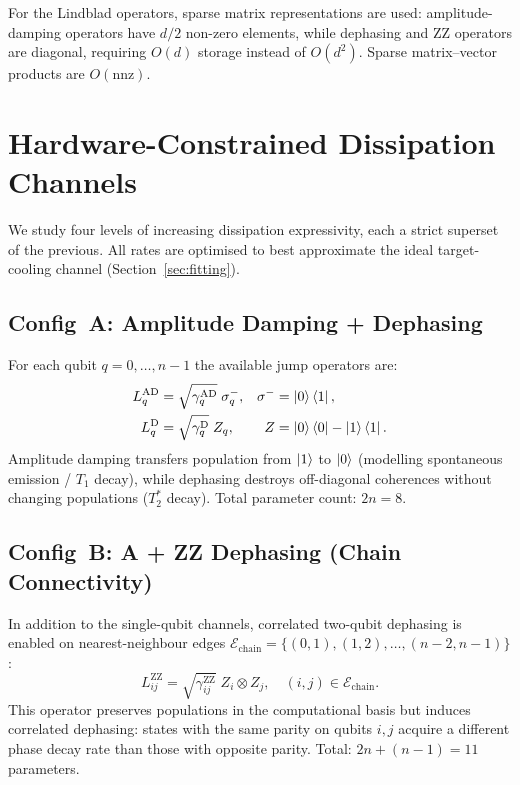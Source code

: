 \documentclass[11pt,a4paper]{article}
\begin{document}
For the Lindblad operators, sparse matrix representations are used:
amplitude-damping operators have $d/2$ non-zero elements, while
dephasing and ZZ operators are diagonal, requiring $O(d)$ storage
instead of $O(d^2)$.  Sparse matrix--vector products are $O(\text{nnz})$.


\section{Hardware-Constrained Dissipation Channels}
\label{sec:channels}

We study four levels of increasing dissipation expressivity, each a
strict superset of the previous.  All rates are optimised to best
approximate the ideal target-cooling channel (Section~\ref{sec:fitting}).

\subsection{Config~A: Amplitude Damping + Dephasing}

For each qubit $q = 0, \ldots, n-1$ the available jump operators are:
\begin{align}
L_q^\text{AD} &= \sqrt{\gamma_q^\text{AD}}\;\sigma_q^- ,
& \sigma^- &= \ket{0}\bra{1}, \label{eq:amp_damp} \\
L_q^\text{D}  &= \sqrt{\gamma_q^\text{D}}\;Z_q ,
& Z &= \ket{0}\bra{0} - \ket{1}\bra{1}. \label{eq:dephasing}
\end{align}
Amplitude damping transfers population from $\ket{1}$ to $\ket{0}$
(modelling spontaneous emission / $T_1$ decay), while dephasing
destroys off-diagonal coherences without changing populations
($T_2^*$ decay).
Total parameter count: $2n = 8$.

\subsection{Config~B: A + ZZ Dephasing (Chain Connectivity)}

In addition to the single-qubit channels, correlated two-qubit
dephasing is enabled on nearest-neighbour edges
$\mathcal{E}_\text{chain} = \{(0,1),(1,2),\ldots,(n{-}2,n{-}1)\}$:
\begin{equation}
L_{ij}^\text{ZZ} = \sqrt{\gamma_{ij}^\text{ZZ}}\;Z_i \otimes Z_j,
\quad (i,j) \in \mathcal{E}_\text{chain}.
\label{eq:zz}
\end{equation}
This operator preserves populations in the computational basis but
induces correlated dephasing: states with the same parity on qubits
$i,j$ acquire a different phase decay rate than those with opposite
parity. Total: $2n + (n-1) = 11$ parameters.
\end{document}
